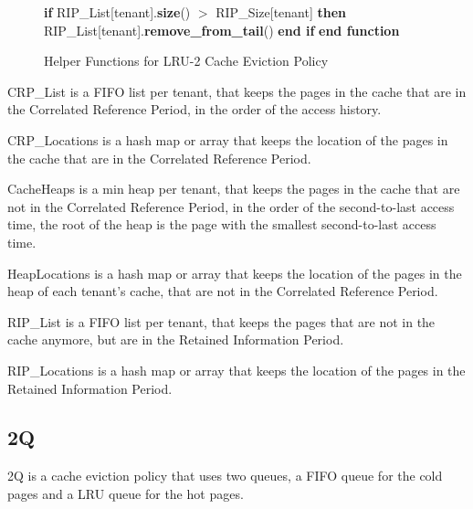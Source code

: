 \begin{figure}[htbp]
\begin{minipage}{\linewidth}
\begin{algorithm}[H]
\begin{algorithmic}
            \STATE \hspace{\algorithmicindent} \hspace{\algorithmicindent} \textbf{if} RIP\_List[tenant].\textbf{size}() $>$ RIP\_Size[tenant] \textbf{then}
            \STATE \hspace{\algorithmicindent} \hspace{\algorithmicindent} \hspace{\algorithmicindent} RIP\_List[tenant].\textbf{remove\_from\_tail}()
            \STATE \hspace{\algorithmicindent} \hspace{\algorithmicindent} \textbf{end if}
            \STATE \textbf{end function}
        \end{algorithmic}
    \end{algorithm}
    \caption{Helper Functions for LRU-2 Cache Eviction Policy}
    \label{fig:lru-2-helper}
    \end{minipage}
\end{figure}

CRP\_List is a FIFO list per tenant, that keeps the pages in the cache that are in the
Correlated Reference Period, in the order of the access history.

CRP\_Locations is a hash map or array that keeps the location of the pages in the cache
that are in the Correlated Reference Period.

CacheHeaps is a min heap per tenant, that keeps the pages in the cache that are not in the
Correlated Reference Period, in the order of the second-to-last access time, the root of
the heap is the page with the smallest second-to-last access time.

HeapLocations is a hash map or array that keeps the location of the pages in the heap 
of each tenant's cache, that are not in the Correlated Reference Period.

RIP\_List is a FIFO list per tenant, that keeps the pages that are not in the cache anymore, 
but are in the Retained Information Period.

RIP\_Locations is a hash map or array that keeps the location of the pages in the Retained
Information Period.

\subsection{2Q}

2Q is a cache eviction policy that uses two queues, a FIFO queue for the
cold pages and a LRU queue for the hot pages.

